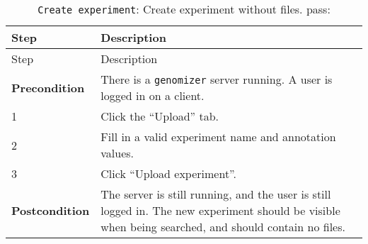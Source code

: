 \begin{longtable}[c]{@{}ll@{}}
\caption{\texttt{Create\ experiment}: Create experiment without files.
pass:}\tabularnewline
\toprule
\begin{minipage}[b]{0.31\columnwidth}\raggedright\strut
Step
\strut\end{minipage} &
\begin{minipage}[b]{0.63\columnwidth}\raggedright\strut
Description
\strut\end{minipage}\tabularnewline
\midrule
\endfirsthead
\toprule
\begin{minipage}[b]{0.31\columnwidth}\raggedright\strut
Step
\strut\end{minipage} &
\begin{minipage}[b]{0.63\columnwidth}\raggedright\strut
Description
\strut\end{minipage}\tabularnewline
\midrule
\endhead
\begin{minipage}[t]{0.31\columnwidth}\raggedright\strut
\textbf{Precondition}
\strut\end{minipage} &
\begin{minipage}[t]{0.63\columnwidth}\raggedright\strut
There is a \texttt{genomizer} server running. A user is logged in on a
client.
\strut\end{minipage}\tabularnewline
\begin{minipage}[t]{0.31\columnwidth}\raggedright\strut
1
\strut\end{minipage} &
\begin{minipage}[t]{0.63\columnwidth}\raggedright\strut
Click the ``Upload'' tab.
\strut\end{minipage}\tabularnewline
\begin{minipage}[t]{0.31\columnwidth}\raggedright\strut
2
\strut\end{minipage} &
\begin{minipage}[t]{0.63\columnwidth}\raggedright\strut
Fill in a valid experiment name and annotation values.
\strut\end{minipage}\tabularnewline
\begin{minipage}[t]{0.31\columnwidth}\raggedright\strut
3
\strut\end{minipage} &
\begin{minipage}[t]{0.63\columnwidth}\raggedright\strut
Click ``Upload experiment''.
\strut\end{minipage}\tabularnewline
\begin{minipage}[t]{0.31\columnwidth}\raggedright\strut
\textbf{Postcondition}
\strut\end{minipage} &
\begin{minipage}[t]{0.63\columnwidth}\raggedright\strut
The server is still running, and the user is still logged in. The new
experiment should be visible when being searched, and should contain no
files.
\strut\end{minipage}\tabularnewline
\bottomrule
\end{longtable}

